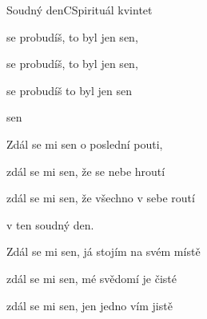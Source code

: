 \begin{song}{Soudný den}{C}{Spirituál kvintet}
\begin{SBChorus*}
 se probudíš, to byl jen sen,

 se probudíš, to byl jen sen,

 se probudíš to byl jen sen

  sen

\end{SBChorus*}

\begin{SBVerse}

Zdál se mi sen o poslední pouti,

zdál se mi sen, že se nebe hroutí

zdál se mi sen, že všechno v sebe routí

v ten soudný den.

\end{SBVerse}

\begin{SBVerse}

Zdál se mi sen, já stojím na svém místě

zdál se mi sen, mé svědomí je čisté

zdál se mi sen, jen jedno vím jistě

 

\end{SBVerse}

\end{song}

\clearpage
